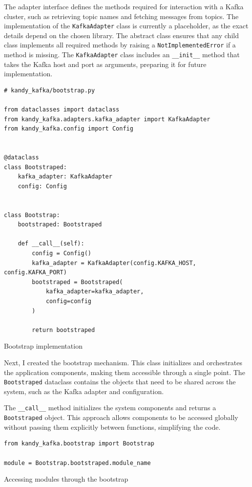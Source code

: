 \documentclass[10pt , a4paper]{report}
\newenvironment{code}{\captionsetup{type=listing}}{}
\begin{document}
The adapter interface defines the methods required for interaction with a Kafka cluster, such as retrieving topic names and fetching messages from topics. The implementation of the \texttt{KafkaAdapter} class is currently a placeholder, as the exact details depend on the chosen library. 
The abstract class ensures that any child class implements all required methods by raising a \texttt{NotImplementedError} if a method is missing. The \texttt{KafkaAdapter} class includes an \texttt{\_\_init\_\_} method that takes the Kafka host and port as arguments, preparing it for future implementation.
\newpage

\begin{code}
  \begin{verbatim}
# kandy_kafka/bootstrap.py

from dataclasses import dataclass
from kandy_kafka.adapters.kafka_adapter import KafkaAdapter
from kandy_kafka.config import Config


@dataclass
class Bootstraped:
    kafka_adapter: KafkaAdapter
    config: Config


class Bootstrap:
    bootstraped: Bootstraped

    def __call__(self):
        config = Config()
        kafka_adapter = KafkaAdapter(config.KAFKA_HOST, config.KAFKA_PORT)
        bootstraped = Bootstraped(
            kafka_adapter=kafka_adapter,
            config=config
        )

        return bootstraped
  \end{verbatim}
\caption{Bootstrap implementation}
\end{code}

Next, I created the bootstrap mechanism. This class initializes and orchestrates the application components, making them accessible through a single point. The \texttt{Bootstraped} dataclass contains the objects that need to be shared across the system, such as the Kafka adapter and configuration.

The \texttt{\_\_call\_\_} method initializes the system components and returns a \texttt{Bootstraped} object. This approach allows components to be accessed globally without passing them explicitly between functions, simplifying the code.

\begin{code}
  \begin{verbatim}
from kandy_kafka.bootstrap import Bootstrap

module = Bootstrap.bootstraped.module_name
  \end{verbatim}
\caption{Accessing modules through the bootstrap}
\end{code}
\end{document}
